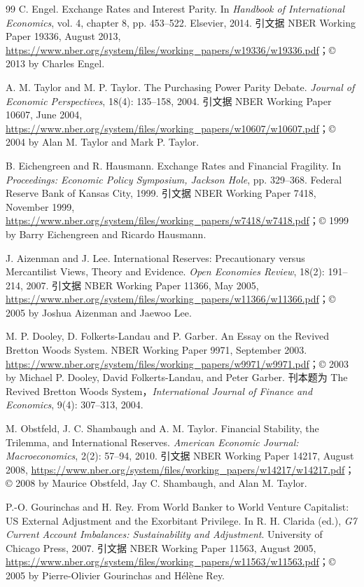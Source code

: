 \begin{thebibliography}{99}
 C. Engel. Exchange Rates and Interest Parity. In \emph{Handbook of International Economics}, vol. 4, chapter 8, pp. 453--522. Elsevier, 2014. 引文据 NBER Working Paper 19336, August 2013, \url{https://www.nber.org/system/files/working_papers/w19336/w19336.pdf}；© 2013 by Charles Engel.

 A. M. Taylor and M. P. Taylor. The Purchasing Power Parity Debate. \emph{Journal of Economic Perspectives}, 18(4): 135--158, 2004. 引文据 NBER Working Paper 10607, June 2004, \url{https://www.nber.org/system/files/working_papers/w10607/w10607.pdf}；© 2004 by Alan M. Taylor and Mark P. Taylor.

 B. Eichengreen and R. Hausmann. Exchange Rates and Financial Fragility. In \emph{Proceedings: Economic Policy Symposium, Jackson Hole}, pp. 329--368. Federal Reserve Bank of Kansas City, 1999. 引文据 NBER Working Paper 7418, November 1999, \url{https://www.nber.org/system/files/working_papers/w7418/w7418.pdf}；© 1999 by Barry Eichengreen and Ricardo Hausmann.

 J. Aizenman and J. Lee. International Reserves: Precautionary versus Mercantilist Views, Theory and Evidence. \emph{Open Economies Review}, 18(2): 191--214, 2007. 引文据 NBER Working Paper 11366, May 2005, \url{https://www.nber.org/system/files/working_papers/w11366/w11366.pdf}；© 2005 by Joshua Aizenman and Jaewoo Lee.

 M. P. Dooley, D. Folkerts-Landau and P. Garber. An Essay on the Revived Bretton Woods System. NBER Working Paper 9971, September 2003. \url{https://www.nber.org/system/files/working_papers/w9971/w9971.pdf}；© 2003 by Michael P. Dooley, David Folkerts-Landau, and Peter Garber. 刊本题为 The Revived Bretton Woods System，\emph{International Journal of Finance and Economics}, 9(4): 307--313, 2004.

 M. Obstfeld, J. C. Shambaugh and A. M. Taylor. Financial Stability, the Trilemma, and International Reserves. \emph{American Economic Journal: Macroeconomics}, 2(2): 57--94, 2010. 引文据 NBER Working Paper 14217, August 2008, \url{https://www.nber.org/system/files/working_papers/w14217/w14217.pdf}；© 2008 by Maurice Obstfeld, Jay C. Shambaugh, and Alan M. Taylor.

 P.-O. Gourinchas and H. Rey. From World Banker to World Venture Capitalist: US External Adjustment and the Exorbitant Privilege. In R. H. Clarida (ed.), \emph{G7 Current Account Imbalances: Sustainability and Adjustment}. University of Chicago Press, 2007. 引文据 NBER Working Paper 11563, August 2005, \url{https://www.nber.org/system/files/working_papers/w11563/w11563.pdf}；© 2005 by Pierre-Olivier Gourinchas and Hélène Rey.


\end{thebibliography}
